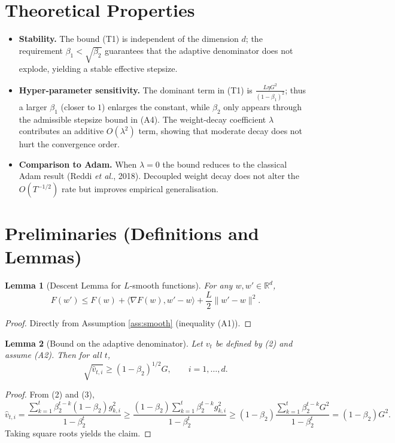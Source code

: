 \documentclass[11pt]{article}
\newtheorem{lemma}{Lemma}
\newcommand{\R}{\mathbb{R}}
\begin{document}
\section*{Theoretical Properties}
\begin{itemize}[leftmargin=*]
\item \textbf{Stability.} The bound (T1) is independent of the dimension $d$; the
  requirement $\beta_{1}<\sqrt{\beta_{2}}$ guarantees that the adaptive denominator
  does not explode, yielding a stable effective stepsize.
\item \textbf{Hyper‑parameter sensitivity.} The dominant term in (T1) is
  $\frac{L\eta G^{2}}{(1-\beta_{1})^{2}}$; thus a larger $\beta_{1}$ (closer to $1$)
  enlarges the constant, while $\beta_{2}$ only appears through the admissible
  stepsize bound in (A4). The weight‑decay coefficient $\lambda$ contributes an
  additive $O(\lambda^{2})$ term, showing that moderate decay does not hurt the
  convergence order.
\item \textbf{Comparison to Adam.} When $\lambda=0$ the bound reduces to the
  classical Adam result (Reddi \emph{et al.}, 2018). Decoupled weight decay does not
  alter the $O(T^{-1/2})$ rate but improves empirical generalisation.
\end{itemize}

\section*{Preliminaries (Definitions and Lemmas)}
\begin{lemma}[Descent Lemma for $L$‑smooth functions]\label{lem:descent}
For any $w,w'\in\R^{d}$,
\[
F(w')\le F(w)+\langle\nabla F(w),w'-w\rangle+\frac{L}{2}\|w'-w\|^{2}.
\]
\end{lemma}
\begin{proof}
Directly from Assumption \ref{ass:smooth} (inequality (A1)). \hfill\qedhere
\end{proof}

\begin{lemma}[Bound on the adaptive denominator]\label{lem:denom}
Let $v_t$ be defined by (2) and assume (A2).
Then for all $t$,
\[
\sqrt{\hat{v}_{t,i}} \ge (1-\beta_{2})^{1/2} G,\qquad i=1,\dots,d.
\]
\end{lemma}
\begin{proof}
From (2) and (3),
\[
\hat{v}_{t,i}
   =\frac{\sum_{k=1}^{t}\beta_{2}^{t-k}(1-\beta_{2}) g_{k,i}^{2}}
          {1-\beta_{2}^{t}}
   \ge\frac{(1-\beta_{2})\sum_{k=1}^{t}\beta_{2}^{t-k} g_{k,i}^{2}}
              {1-\beta_{2}^{t}}
   \ge (1-\beta_{2})\frac{\sum_{k=1}^{t}\beta_{2}^{t-k} G^{2}}
                         {1-\beta_{2}^{t}}
   = (1-\beta_{2}) G^{2}.
\]
Taking square roots yields the claim. \hfill\qedhere
\end{proof}
\end{document}
